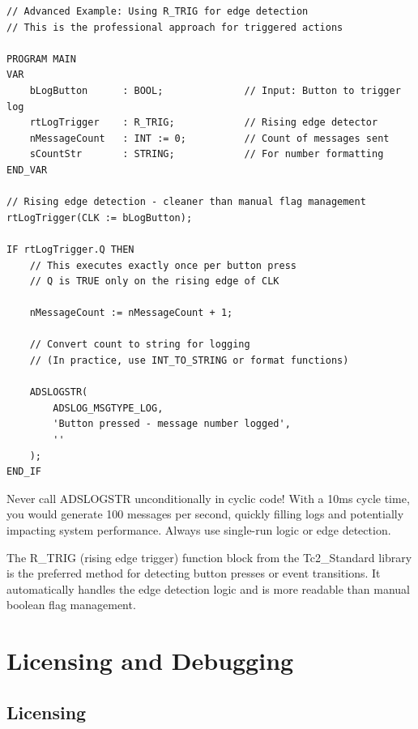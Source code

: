 \documentclass[11pt,a4paper]{article}
\begin{document}
\begin{lstlisting}
// Advanced Example: Using R_TRIG for edge detection
// This is the professional approach for triggered actions

PROGRAM MAIN
VAR
    bLogButton      : BOOL;              // Input: Button to trigger log
    rtLogTrigger    : R_TRIG;            // Rising edge detector
    nMessageCount   : INT := 0;          // Count of messages sent
    sCountStr       : STRING;            // For number formatting
END_VAR

// Rising edge detection - cleaner than manual flag management
rtLogTrigger(CLK := bLogButton);

IF rtLogTrigger.Q THEN
    // This executes exactly once per button press
    // Q is TRUE only on the rising edge of CLK
    
    nMessageCount := nMessageCount + 1;
    
    // Convert count to string for logging
    // (In practice, use INT_TO_STRING or format functions)
    
    ADSLOGSTR(
        ADSLOG_MSGTYPE_LOG,
        'Button pressed - message number logged',
        ''
    );
END_IF
\end{lstlisting}

\begin{warningbox}
Never call ADSLOGSTR unconditionally in cyclic code! With a 10ms cycle time, you would generate 100 messages per second, quickly filling logs and potentially impacting system performance. Always use single-run logic or edge detection.
\end{warningbox}

\begin{tipbox}
The R\_TRIG (rising edge trigger) function block from the Tc2\_Standard library is the preferred method for detecting button presses or event transitions. It automatically handles the edge detection logic and is more readable than manual boolean flag management.
\end{tipbox}

\section{Licensing and Debugging}

\subsection{Licensing}
\end{document}
